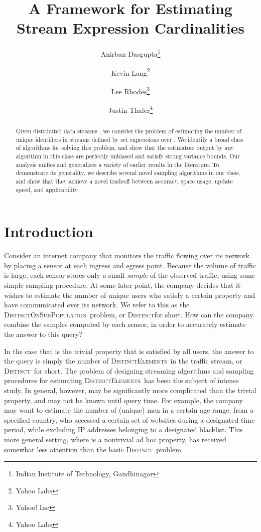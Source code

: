 \documentclass{article}
\title{A Framework for Estimating Stream Expression Cardinalities}
\author{Anirban Dasgupta\thanks{Indian Institute of Technology, Gandhinagar} \and Kevin Lang\thanks{Yahoo Labs} \and Lee Rhodes\thanks{Yahoo! Inc} \and Justin Thaler\thanks{Yahoo Labs}}
\date{}
\newcommand{\distinctsubP}{\textsc{DistinctOnSubPopulation}}
\newcommand{\distinct}{\textsc{Distinct}}
\newcommand{\DistinctElements}{\textsc{DistinctElements}}
\begin{document}
\maketitle

\begin{abstract}
Given  distributed data streams , we consider the problem 
of estimating the number of unique identifiers in streams defined by set expressions over .
We identify a broad class of algorithms for solving this problem, and show that the estimators output by any algorithm in this class 
are perfectly unbiased and satisfy strong variance bounds. Our analysis unifies and generalizes a variety of earlier results in the literature. 
To demonstrate its generality, we describe several novel sampling algorithms in our class, and show that they
achieve a novel tradeoff between accuracy, space usage, update speed, and applicability. \end{abstract}

\section{Introduction} 
Consider an internet company that monitors the traffic flowing over its network by placing 
a sensor at each ingress and egress point. Because the volume of traffic is large,
each sensor stores only a small \emph{sample} of the observed traffic, using some simple sampling procedure. 
At some later point, the company
decides that it wishes to estimate the number of unique users who satisfy a certain property  and have communicated over its network.
We refer to this as the \distinctsubP\ problem, or \distinct for short.
How can the company combine the samples computed by each sensor, in order to accurately estimate the answer to this query?
 
In the case that  is the trivial property that is satisfied by all users, the answer to the query is simply the 
number of \DistinctElements\ in the traffic stream, or \distinct\ for short. The problem of designing streaming algorithms and sampling procedures
for estimating \DistinctElements\ has been the subject of intense study. In general, however,  may be significantly more complicated than the trivial property, and may not be known until query time. 
For example, the company may want to estimate the number of (unique) men in a certain age range,
 from a specified country, who accessed a certain set of websites during a designated time period, while excluding IP addresses belonging to a 
 designated blacklist.  
This more general setting, where  is a nontrivial ad hoc property, has received somewhat less attention than the basic \distinct\ problem.
\end{document}
